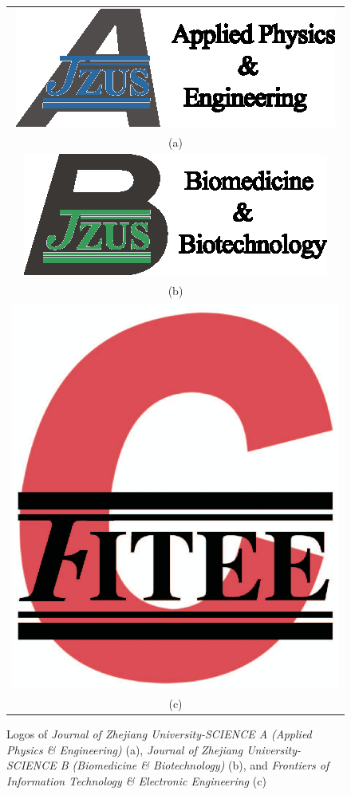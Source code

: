 \documentclass[twoside,twocolumn]{article}
\begin{document}
\begin{figure}[!htb]\small
\centering
\begin{tabular}{c}
\includegraphics[scale=0.9]{pics/jzusalogo.eps}\\
{\footnotesize\sf (a)} \\[3mm]
\includegraphics[scale=0.9]{pics/jzusblogo.eps}\\
{\footnotesize\sf (b)} \\
\includegraphics[scale=0.26]{pics/fiteelogo.eps}\\
{\footnotesize\sf (c)} \\
\end{tabular}
\caption{Logos of \emph{Journal of Zhejiang University-SCIENCE A (Applied Physics {\sf \slshape \&} Engineering)} (a), \emph{Journal of Zhejiang University-SCIENCE B (Biomedicine {\sf \slshape \&} Biotechnology)} (b), and \emph{Frontiers of Information Technology {\sf \slshape \&} Electronic Engineering} (c)}
\label{fig:logo}
\end{figure}
\end{document}
